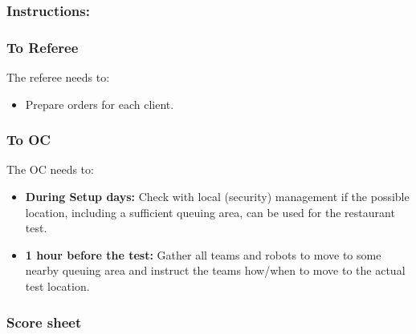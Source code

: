 \subsubsection*{Instructions:}

\subsubsection*{To Referee}

The referee needs to:
\begin{itemize}
	\item Prepare orders for each client.
\end{itemize}

\subsubsection*{To OC}
The OC needs to:
\begin{itemize}[nosep]
	\item \textbf{During Setup days:} Check with local (security) management if the possible location, including a sufficient queuing area, can be used for the restaurant test.
	\item \textbf{1 hour before the test:} Gather all teams and robots to move to some nearby queuing area and instruct the teams how/when to move to the actual test location.
\end{itemize}

\subsubsection*{Score sheet}
%





